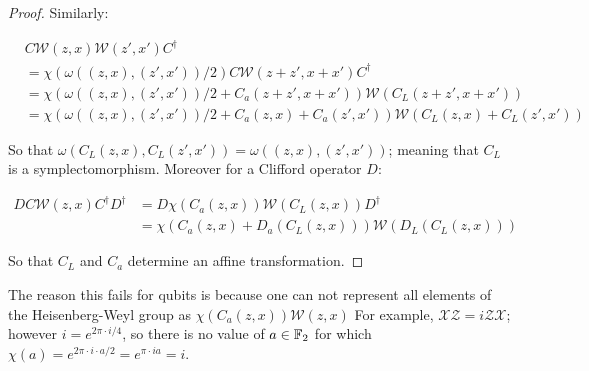 \begin{proof}
Similarly:

\begin{align*}
&C\mathcal{W}(z,x)\mathcal{W}(z',x')C^\dag\\
&= \chi(\omega((z,x),(z',x'))/2) C \mathcal{W}(z+z',x+x') C^\dag\\
&= \chi(\omega((z,x),(z',x'))/2+C_a(z+z',x+x')) \mathcal{W}(C_{L}(z+z',x+x'))\\
&= \chi(\omega((z,x),(z',x'))/2+C_a(z,x)+ C_a(z',x')) \mathcal{W}(C_L(z,x)+C_L(z',x'))
\end{align*}

So that $\omega(C_L(z,x),C_L(z',x')) = \omega((z,x),(z',x'))$; meaning that $C_L$ is a symplectomorphism. Moreover for a Clifford operator $D$:

\begin{align*}
DC {\mathcal W}(z,x) C^\dag D^\dag
&=D\chi(C_a(z,x)){\mathcal W}(C_L(z,x))D^\dag\\
&=\chi(C_a(z,x)+D_a(C_L(z,x))){\mathcal W}(D_L(C_L(z,x)))
\end{align*}

So that $C_L$ and $C_a$ determine an affine transformation.
\end{proof}\endgroup

The reason this fails for qubits is because one can not represent all elements of the Heisenberg-Weyl group as 
$
\chi(C_a(z,x)){\mathcal W}(z,x)
$
 For example, $\mathcal{X}\mathcal{Z} = i \mathcal{Z}\mathcal{X}$; however $i=e^{2\pi \cdot i/4}$, so there is no value of $a\in \mathbb{F}_2$ for which $\chi(a)=e^{2\pi\cdot i\cdot a/2} =e^{\pi\cdot i a} = i$.

